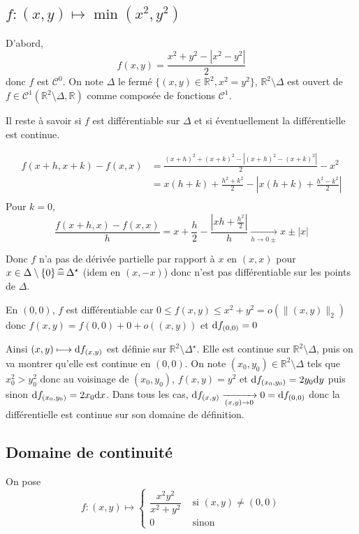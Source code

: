 \subsection{\texorpdfstring{$f:(x, y)\longmapsto \min(x^2, y^2)$}{f(x, y)=min(x², y²)}}

D'abord, \[
    f(x, y)=\frac{x^2+y^2-|x^2-y^2|}2
\]
donc $f$ est $\mathcal C^0$. On note $\Delta$ le fermé $\{(x, y)\in\mathbb R^2, x^2=y^2\}$, $\mathbb R^2\setminus \Delta$ est ouvert de $f\in \mathcal C^1(\mathbb R^2\setminus \Delta, \mathbb R)$ comme composée de fonctions $\mathcal C^1$.

Il reste à savoir si $f$ est différentiable sur $\Delta$ et si éventuellement la différentielle est continue.

\begin{align*}
    f(x+h, x+k)-f(x,x) &= \frac{(x+h)^2+(x+k)^2-|(x+h)^2-(x+k)^2|}{2}-x^2 \\
                       &= x(h+k)+\frac{h^2+k^2}2 - \left|x(h+k)+ \frac{h^2-k^2}{2}  \right| \\
\end{align*}
Pour $k=0$, \[
    \frac{f(x+h, x)-f(x, x)}h=x+\frac h2-\frac{\left|xh+\frac{h^2}2\right|}h\xrightarrow[h\to0\pm]{}x\pm|x|
\]

Donc $f$ n'a pas de dérivée partielle par rapport à $x$ en $(x, x)$ pour $x\in\Delta\setminus\{0\}\,\widehat=\,\Delta^\star$ (idem en $(x, -x)$) donc n'est pas différentiable sur les points de $\Delta$.

En $(0, 0)$, $f$ est différentiable car $0\leq f(x, y)\leq x^2+y^2=o(\|(x, y)\|_2)$ donc $f(x, y)=f(0, 0)+0+o((x, y))$ et $\mathrm{d} f_{(0, 0)}=0$

Ainsi $(x, y)\longmapsto \mathrm{d} f_{(x, y)}$ est définie sur $\mathbb R^2\setminus \Delta^\star$. Elle est continue sur $\mathbb R^2\setminus \Delta$, puis on va montrer qu'elle est continue en $(0, 0)$. On note $(x_0, y_0)\in\mathbb R^2\setminus \Delta$ tels que $x_0^2>y_0^2$ donc au voisinage de $(x_0, y_0)$, $f(x, y)=y^2$ et $\mathrm{d} f_{(x_0, y_0)}=2y_0\mathrm{d} y$ puis sinon $\mathrm{d} f_{(x_0, y_0)}=2x_0\mathrm{d} x$. Dans tous les cas, $\mathrm{d} f_{(x, y)}\xrightarrow[(x, y)\to 0]{}0=\mathrm{d} f_{(0, 0)}$ donc la différentielle est continue sur son domaine de définition.

\subsection{Domaine de continuité}

On pose \[
    f:(x, y)\longmapsto \begin{cases}
        \dfrac{x^2y^2}{x^2+y^2} &\text{ si } (x, y)\neq (0, 0) \\
        0 &\text{ sinon }
    \end{cases}
\]

